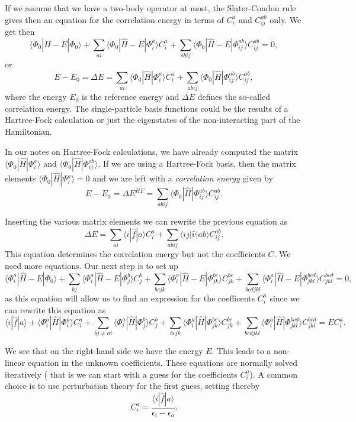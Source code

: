 If we assume that we have a two-body operator at most, the Slater-Condon rule 
gives then an equation for the 
correlation energy in terms of $C_i^a$ and $C_{ij}^{ab}$ only.  We get then
\[
\langle \Phi_0 | \hat{H} -E| \Phi_0\rangle + \sum_{ai}\langle \Phi_0 | \hat{H} -E|\Phi_{i}^{a} \rangle C_{i}^{a}+
\sum_{abij}\langle \Phi_0 | \hat{H} -E|\Phi_{ij}^{ab} \rangle C_{ij}^{ab}=0,
\]
or 
\[
E-E_0 =\Delta E=\sum_{ai}\langle \Phi_0 | \hat{H}|\Phi_{i}^{a} \rangle C_{i}^{a}+
\sum_{abij}\langle \Phi_0 | \hat{H}|\Phi_{ij}^{ab} \rangle C_{ij}^{ab},
\]
where the energy $E_0$ is the reference energy and $\Delta E$ defines the so-called correlation energy.
The single-particle basis functions  could be the results of a Hartree-Fock calculation or just the eigenstates of the non-interacting part of the Hamiltonian. 

In our notes on Hartree-Fock calculations, 
we have already computed the matrix $\langle \Phi_0 | \hat{H}|\Phi_{i}^{a}\rangle $ and $\langle \Phi_0 | \hat{H}|\Phi_{ij}^{ab}\rangle$.  If we are using a Hartree-Fock basis, then the matrix elements
$\langle \Phi_0 | \hat{H}|\Phi_{i}^{a}\rangle=0$ and we are left with a \emph{correlation energy} given by
\[
E-E_0 =\Delta E^{HF}=\sum_{abij}\langle \Phi_0 | \hat{H}|\Phi_{ij}^{ab} \rangle C_{ij}^{ab}. 
\]


Inserting the various matrix elements we can rewrite the previous equation as
\[
\Delta E=\sum_{ai}\langle i| \hat{f}|a \rangle C_{i}^{a}+
\sum_{abij}\langle ij | \hat{v}| ab \rangle C_{ij}^{ab}.
\]
This equation determines the correlation energy but not the coefficients $C$. 
We need more equations. Our next step is to set up
\[
\langle \Phi_i^a | \hat{H} -E| \Phi_0\rangle + \sum_{bj}\langle \Phi_i^a | \hat{H} -E|\Phi_{j}^{b} \rangle C_{j}^{b}+
\sum_{bcjk}\langle \Phi_i^a | \hat{H} -E|\Phi_{jk}^{bc} \rangle C_{jk}^{bc}+
\sum_{bcdjkl}\langle \Phi_i^a | \hat{H} -E|\Phi_{jkl}^{bcd} \rangle C_{jkl}^{bcd}=0,
\]
as this equation will allow us to find an expression for the coefficents $C_i^a$ since we can rewrite this equation as 
\[
\langle i | \hat{f}| a\rangle +\langle \Phi_i^a | \hat{H}|\Phi_{i}^{a} \rangle C_{i}^{a}+ \sum_{bj\ne ai}\langle \Phi_i^a | \hat{H}|\Phi_{j}^{b} \rangle C_{j}^{b}+
\sum_{bcjk}\langle \Phi_i^a | \hat{H}|\Phi_{jk}^{bc} \rangle C_{jk}^{bc}+
\sum_{bcdjkl}\langle \Phi_i^a | \hat{H}|\Phi_{jkl}^{bcd} \rangle C_{jkl}^{bcd}=EC_i^a.
\]

We see that on the right-hand side we have the energy $E$. This leads to a non-linear equation in the unknown coefficients. 
These equations are normally solved iteratively ( that is we can start with a guess for the coefficients $C_i^a$). A common choice is to use perturbation theory for the first guess, setting thereby
\[
 C_{i}^{a}=\frac{\langle i | \hat{f}| a\rangle}{\epsilon_i-\epsilon_a}.
\]

